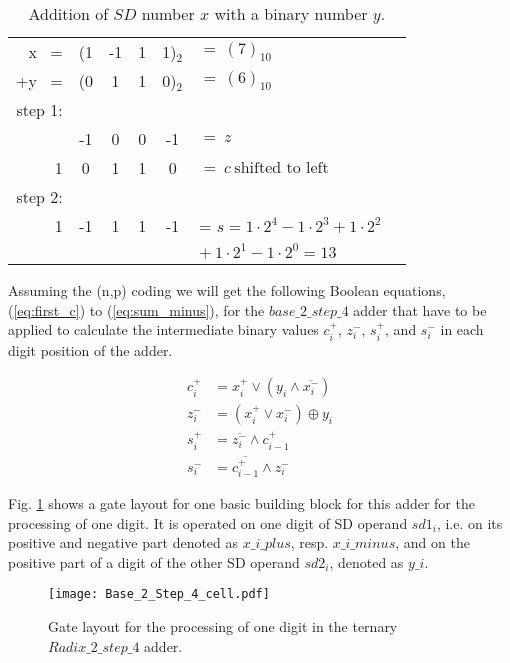\documentclass[pageno]{jpaper}
\begin{document}
\begin{table}[htbp]
\centering%
\begin{tabular}{rccccll}
x \  = & (1 & -1 & 1 & 1)$_2$ & $= \ (7)_{10}$ \\
+y \ = & (0 &  1 & 1 & 0)$_2$ & $= \ (6)_{10}$ \\ 
\hline
\vspace{6pt}
step 1:\\
      & -1 & 0 & 0 & -1 & $= \ z$ \\
         1 &  0 & 1 & 1 &  0 & $= \ c \ \text{shifted to left}$ \\
\hline
\vspace{6pt}
step 2:\\
     1 & -1 & 1 & 1 & -1 & = $s = 1 \cdot 2^4 - 1 \cdot 2^3 + 1 \cdot 2^2$\\
       & & & & & $  + \ 1 \cdot 2^1 -1 \cdot 2^0 = 13$ \\ 
\hline
\end{tabular}
\caption{Addition of $SD$ number $x$ with a binary number $y$.}
\label{table:Add_SD_Binary}
\end{table} 

Assuming the (n,p) coding we will get the following Boolean equations, (\ref{eq:first_c}) to (\ref{eq:sum_minus}), for the $base\_2\_step\_4$ adder that have to be applied to calculate the intermediate binary values $c_i^+$, $z_i^-$, $s_i^+$, and $s_i^-$ in each digit position of the adder. 

\begin{align}
\label{eq:first_c}
c_i^+&=x_i^+ \vee \left( y_i \wedge \overline{x_i^-} \right) \\ 
\label{eq:first_z}
z_i^-&=\left( x_i^+ \vee x_i^- \right) \oplus y_i  \\
\label{eq:sum_plus}
s_i^+&=\overline{z_i^-} \wedge c_{i-1}^+\\ 
\label{eq:sum_minus}
s_i^-&=\overline{c_{i-1}^+} \wedge z_i^-  
\end{align}

Fig. \ref{fig:base_2_step_4_adder_cell} shows a gate layout for one basic building block for this adder for the processing of one digit. It is operated on one digit of SD operand $sd1_i$, i.e. on its positive and negative part denoted as $x\_i\_plus$, resp. $x\_i\_minus$, and on the positive part of a digit of the other SD operand $sd2_i$, denoted as $y\_i$.  

\begin{figure}[htbp]
\centering
\texttt{[image: Base\_2\_Step\_4\_cell.pdf]}
\caption{Gate layout for the processing of one digit in the ternary $Radix\_2\_step\_4$ adder.}
\label{fig:base_2_step_4_adder_cell}
\end{figure}
\end{document}
